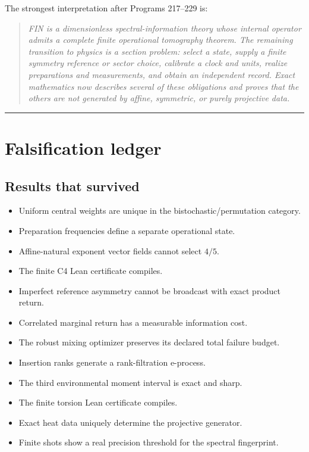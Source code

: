 \documentclass[11pt,a4paper,openany]{report}
\begin{document}
The strongest interpretation after Programs 217--229 is:

\begin{quote}\itshape
FIN is a dimensionless spectral-information theory whose internal operator admits a complete finite operational tomography theorem. The remaining transition to physics is a section problem: select a state, supply a finite symmetry reference or sector choice, calibrate a clock and units, realize preparations and measurements, and obtain an independent record. Exact mathematics now describes several of these obligations and proves that the others are not generated by affine, symmetric, or purely projective data.

\end{quote}

\par\medskip\hrule\medskip

\chapter{Falsification ledger}

\section{Results that survived}

\begin{itemize}
\item 
Uniform central weights are unique in the bistochastic/\allowbreak{}permutation category.

\item 
Preparation frequencies define a separate operational state.

\item 
Affine-natural exponent vector fields cannot select \(4/5\).

\item 
The finite C4 Lean certificate compiles.

\item 
Imperfect reference asymmetry cannot be broadcast with exact product return.

\item 
Correlated marginal return has a measurable information cost.

\item 
The robust mixing optimizer preserves its declared total failure budget.

\item 
Insertion ranks generate a rank-filtration e-process.

\item 
The third environmental moment interval is exact and sharp.

\item 
The finite torsion Lean certificate compiles.

\item 
Exact heat data uniquely determine the projective generator.

\item 
Finite shots show a real precision threshold for the spectral fingerprint.

\end{itemize}
\end{document}
